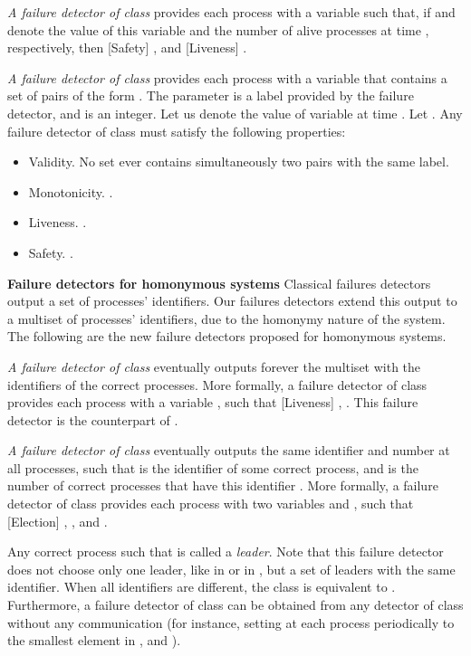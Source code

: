 \documentclass[10pt, conference, compsocconf]{IEEEtran}
\newcommand{\tightparagraph}[1]{\smallskip \noindent \textbf{#1} \hspace{1ex}}
\begin{document}
\emph{A failure detector of class } \cite{DBLP:conf/wdag/BonnetR09}
provides each process   with a variable  such that, 
if  and  denote the value of this variable and 
the number of alive processes at time , respectively, then [Safety]
 , 
and [Liveness]
 .

\emph{A failure detector of class } \cite{DBLP:conf/wdag/BonnetR10}
provides each process   with a variable  that 
contains a set of pairs of the form . The parameter  is a 
label provided by the failure detector, and  is an integer. 
Let us denote  the value of variable  at 
time . 
Let .
Any failure detector of class  must satisfy the following properties: 

\begin{itemize}
\item
Validity.  No set  ever contains simultaneously two pairs 
with the same label. 
\item Monotonicity. 
.
\item
Liveness.
 .
\item
Safety.
.
\end{itemize}



\tightparagraph{Failure detectors for homonymous systems}
Classical failures detectors output a set of processes' identifiers. 
Our failures detectors extend this output to 
a multiset of processes' identifiers, due to the homonymy nature of the system.
The following are the new failure detectors proposed for homonymous systems. 


\emph{A failure detector of class } eventually 
outputs forever the multiset with the 
identifiers of the correct processes. More formally,
a failure detector of class  provides each process   
with a variable , such that [Liveness]
, 
. This failure detector  is the 
counterpart of .

\emph{A failure detector of class } 
eventually outputs the same identifier 
and number  at all processes, such that  is the identifier of 
some correct process, and  is the number of correct processes that 
have this identifier . More formally,
a failure detector of class  provides each process   
with two variables  and , such that 
[Election] , , 
and .

Any correct process  such that  is called a \emph{leader}.
Note that this failure detector does not choose only one leader, like 
in  or in , but a set of leaders with the same identifier. 
When all identifiers are different, the class  is equivalent to . 
Furthermore, a failure detector of class  can be obtained from any 
detector  of class  without any communication (for instance, 
setting at each process  periodically  to the smallest 
element in , and 
).
\end{document}
